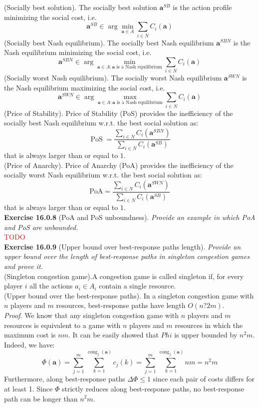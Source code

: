 (Socially best solution). The socially best solution $\mathbf{a}^{SB}$ is the action profile minimizing the social cost, i.e.
$$
\mathbf{a}^{S B} \in \arg \min _{\mathbf{a} \in A} \sum_{i \in N} C_{i}(\mathbf{a})
$$
(Socially best Nash equilibrium). The socially best Nash equilibrium $\mathbf{a}^{SBN}$ is the Nash equilibrium minimizing the social cost, i.e.
$$
\mathbf{a}^{S B N} \in \arg \min _{\mathbf{a} \in A: \mathbf{a} \text { is a Nash equilibrium}} \sum_{i \in N} C_{i}(\mathbf{a})
$$
(Socially worst Nash equilibrium). The socially worst Nash equilibrium $\mathbf{a}^{SWN}$ is the Nash equilibrium maximizing the social cost, i.e.
$$
\mathbf{a}^{S W N} \in \arg \max _{\mathbf{a} \in A: \mathbf{a} \text { is a Nash equilibrium}} \sum_{i \in N} C_{i}(\mathbf{a})
$$
(Price of Stability). Price of Stability (PoS) provides the inefficiency of the socially best Nash equilibrium w.r.t. the best social solution as:
$$
\operatorname{PoS}=\frac{\sum_{i \in N} C_{i}\left(\mathbf{a}^{S B N}\right)}{\sum_{i \in N} C_{i}\left(\mathbf{a}^{S B}\right)}
$$
that is always larger than or equal to $1$.\\
(Price of Anarchy). Price of Anarchy (PoA) provides the inefficiency of the socially worst Nash equilibrium w.r.t. the best social solution as:
$$
\mathrm{PoA}=\frac{\sum_{i \in N} C_{i}\left(\mathbf{a}^{S W N}\right)}{\sum_{i \in N} C_{i}\left(\mathbf{a}^{S B}\right)}
$$
that is always larger than or equal to $1$.\\

\textbf{Exercise 16.0.8} (PoA and PoS unboundness). \textit{Provide an example in which PoA and PoS are unbounded.}\\

\textcolor{red}{TODO}\\

\textbf{Exercise 16.0.9} (Upper bound over best-response paths length). \textit{Provide an upper bound over the length of best-response paths in singleton congestion games and prove it.}\\

(Singleton congestion game).A congestion game is called singleton if, for every player $i$ all the actions $a_i \in A_i$ contain a single resource.\\
(Upper bound over the best-response paths). In a singleton congestion game with $n$ players and $m$ resources, best-response paths have length $O(n?2 m)$.\\
\textit{Proof}. We know that any singleton congestion game with $n$ players and $m$ resources is equivalent to a game with $n$ players and $m$ resources in which the maximum cost is $nm$. It can be easily showed that $	Phi$ is upper bounded by $n^2 m$. Indeed, we have:
$$\Phi(\mathbf{a})=\sum_{j=1}^{m} \sum_{k=1}^{\operatorname{cong}_{j}(\mathbf{a})} c_{j}(k)=\sum_{j=1}^{m} \sum_{k=1}^{\operatorname{cong}_{j}(\mathbf{a})} n m=n^{2} m$$
Furthermore, along best-response paths $\Delta \Phi \leqslant 1$ since each pair of costs differs for at least 1. Since $\Phi$ strictly reduces along best-response paths, no best-response path can be longer than $n^2 m$.

